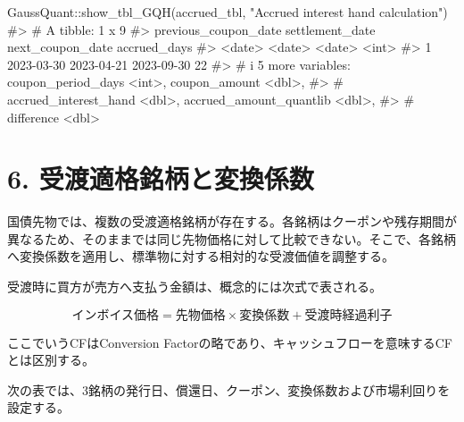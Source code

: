 \documentclass[
  letterpaper,
  DIV=11,
  numbers=noendperiod]{scrreprt}
\newenvironment{Shaded}{\begin{snugshade}}{\end{snugshade}}
\newcommand{\CommentTok}[1]{\textcolor[rgb]{0.37,0.37,0.37}{#1}}
\newcommand{\FunctionTok}[1]{\textcolor[rgb]{0.28,0.35,0.67}{#1}}
\newcommand{\NormalTok}[1]{\textcolor[rgb]{0.00,0.23,0.31}{#1}}
\newcommand{\SpecialCharTok}[1]{\textcolor[rgb]{0.37,0.37,0.37}{#1}}
\newcommand{\StringTok}[1]{\textcolor[rgb]{0.13,0.47,0.30}{#1}}
\begin{document}
\begin{Shaded}
\begin{Highlighting}[]
\NormalTok{GaussQuant}\SpecialCharTok{::}\FunctionTok{show\_tbl\_GQH}\NormalTok{(accrued\_tbl, }\StringTok{"Accrued interest hand calculation"}\NormalTok{)}
\CommentTok{\#\textgreater{} \# A tibble: 1 x 9}
\CommentTok{\#\textgreater{}   previous\_coupon\_date settlement\_date next\_coupon\_date accrued\_days}
\CommentTok{\#\textgreater{}   \textless{}date\textgreater{}               \textless{}date\textgreater{}          \textless{}date\textgreater{}                  \textless{}int\textgreater{}}
\CommentTok{\#\textgreater{} 1 2023{-}03{-}30           2023{-}04{-}21      2023{-}09{-}30                 22}
\CommentTok{\#\textgreater{} \# i 5 more variables: coupon\_period\_days \textless{}int\textgreater{}, coupon\_amount \textless{}dbl\textgreater{},}
\CommentTok{\#\textgreater{} \#   accrued\_interest\_hand \textless{}dbl\textgreater{}, accrued\_amount\_quantlib \textless{}dbl\textgreater{},}
\CommentTok{\#\textgreater{} \#   difference \textless{}dbl\textgreater{}}
\end{Highlighting}
\end{Shaded}

\section{6.
受渡適格銘柄と変換係数}\label{ux53d7ux6e21ux9069ux683cux9298ux67c4ux3068ux5909ux63dbux4fc2ux6570}

国債先物では、複数の受渡適格銘柄が存在する。各銘柄はクーポンや残存期間が異なるため、そのままでは同じ先物価格に対して比較できない。そこで、各銘柄へ変換係数を適用し、標準物に対する相対的な受渡価値を調整する。

受渡時に買方が売方へ支払う金額は、概念的には次式で表される。

\[
\text{インボイス価格}
=
\text{先物価格}
\times
\text{変換係数}
+
\text{受渡時経過利子}
\]

ここでいうCFはConversion
Factorの略であり、キャッシュフローを意味するCFとは区別する。

次の表では、3銘柄の発行日、償還日、クーポン、変換係数および市場利回りを設定する。
\end{document}
